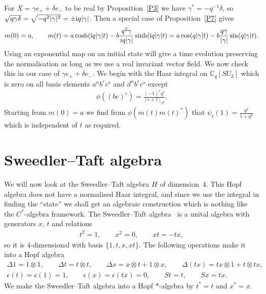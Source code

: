 \documentclass[pdftex]{sigma}
\numberwithin{equation}{section}
\newcommand{\tens}{\mathop{\otimes}}
\newcommand{\C}{\mathbb{C}}
\newcommand{\<}{\langle}
\renewcommand{\>}{\rangle}
\begin{document}
\begin{Example}
	For $ X= \gamma e_{+} + \delta e_{-} $ to be real by Proposition~\ref{P3} we have $ \gamma^{*} =-q^{-1} \delta $, so $ \sqrt{q \gamma \delta}=\sqrt{-q^{2}| \gamma|^{2}} =\pm {\rm i} q | \gamma|$. Then a special case of Proposition~\ref{P7} gives
\begin{gather*}%
	m(0)=a, \qquad m(t)	=a \cosh ({\rm i} q | \gamma|t)-b\frac{q^{2}\gamma}{i q | \gamma|} \sinh ({\rm i} q | \gamma|t)= a \cos (q | \gamma|t)-b\frac{ q \gamma } {| \gamma |} \sin (q | \gamma|t).
\end{gather*}
Using an exponential map on an initial state will give a time evolution preserving the normalisation as long as we use a real invariant vector field. We now check this in our case of $ \gamma e_{+}+ \delta e_{-} $. We begin with the Haar integral on $ \C_{q}[SU_{2}] $ which is zero on all basis elements $ a^{n} b^{r} c^{s} $ and $ d^{n} b^{r} c^{s} $ except
\begin{align*}
	\phi ((bc)^{r})=\frac{(-1)^{r}q^{r}}{[r+1]_{q^{2}}}.
\end{align*}
Starting from $ m(0)=a $ we find from $ \phi(m(t) m(t)^{*}) $ that $ \psi_{t}(1)=\frac{q^{2}}{1+q^{2}} $ which is independent of $ t $ as required.
\end{Example}

\section[Sweedler-Taft algebra]{Sweedler--Taft algebra}
We will now look at the Sweedler--Taft algebra $ H $ of dimension~$ 4 $. This Hopf algebra does not have a normalised Haar integral, and since we use the integral in finding the ``state'' we shall get an algebraic construction which is nothing like the $ C^{*} $-algebra framework. The Sweedler--Taft algebra~\cite{Taft} is a unital algebra with generators $ x$, $t $ and relations
\begin{gather*}
		t^{2}=1,\qquad x^{2}=0, \qquad xt=-tx,
\end{gather*}
so it is 4-dimensional with basis $ \{1,t,x,xt\} $. The following operations make it into a Hopf algebra
	\begin{gather*}
		\Delta 1 =1 \tens 1, \qquad\Delta t= t \tens t, \qquad \Delta x = x \tens t + 1 \tens x, \qquad \Delta(t x)= t x \tens 1 + t \tens tx,\\ \epsilon(t)=\epsilon(1)=1, \qquad \epsilon(x)=\epsilon(t x)=0, \qquad St=t, \qquad Sx= t x.
	\end{gather*}
We make the Sweedler--Taft algebra into a Hopf $ * $-algebra by $ t^{*} =t$ and $ x^{*}= x $.
\end{document}
